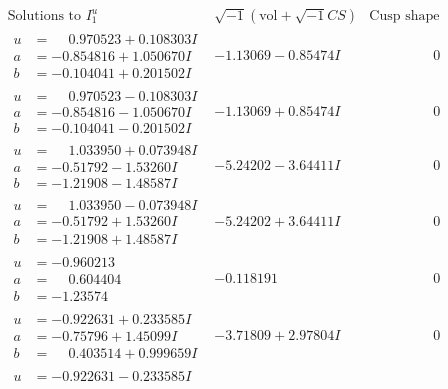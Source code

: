\documentclass[1p]{elsarticle_modified}
\theoremstyle{definition}
\newcommand{\I}{\sqrt{-1}}
\begin{document}
$$\begin{array}{c|c|c}  
\text{Solutions to }I^u_{1}& \I (\text{vol} + \sqrt{-1}CS) & \text{Cusp shape}\\
 \hline 
\begin{aligned}
u &= \phantom{-}0.970523 + 0.108303 I \\
a &= -0.854816 + 1.050670 I \\
b &= -0.104041 + 0.201502 I\end{aligned}
 & -1.13069 - 0.85474 I & \phantom{-0.000000 } 0 \\ \hline\begin{aligned}
u &= \phantom{-}0.970523 - 0.108303 I \\
a &= -0.854816 - 1.050670 I \\
b &= -0.104041 - 0.201502 I\end{aligned}
 & -1.13069 + 0.85474 I & \phantom{-0.000000 } 0 \\ \hline\begin{aligned}
u &= \phantom{-}1.033950 + 0.073948 I \\
a &= -0.51792 - 1.53260 I \\
b &= -1.21908 - 1.48587 I\end{aligned}
 & -5.24202 - 3.64411 I & \phantom{-0.000000 } 0 \\ \hline\begin{aligned}
u &= \phantom{-}1.033950 - 0.073948 I \\
a &= -0.51792 + 1.53260 I \\
b &= -1.21908 + 1.48587 I\end{aligned}
 & -5.24202 + 3.64411 I & \phantom{-0.000000 } 0 \\ \hline\begin{aligned}
u &= -0.960213\phantom{ +0.000000I} \\
a &= \phantom{-}0.604404\phantom{ +0.000000I} \\
b &= -1.23574\phantom{ +0.000000I}\end{aligned}
 & -0.118191\phantom{ +0.000000I} & \phantom{-0.000000 } 0 \\ \hline\begin{aligned}
u &= -0.922631 + 0.233585 I \\
a &= -0.75796 + 1.45099 I \\
b &= \phantom{-}0.403514 + 0.999659 I\end{aligned}
 & -3.71809 + 2.97804 I & \phantom{-0.000000 } 0 \\ \hline\begin{aligned}
u &= -0.922631 - 0.233585 I \\

\end{aligned}
\end{array}$$
\end{document}
